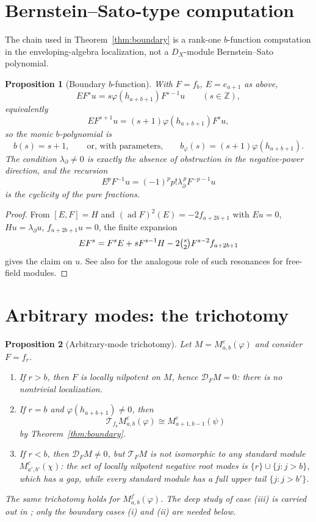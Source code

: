 \documentclass[11pt,a4paper]{article}
\newcommand{\Z}{\mathbb Z}
\newcommand{\ad}{\operatorname{ad}}
\newcommand{\D}{\mathcal D}
\newcommand{\T}{\mathcal T}
\theoremstyle{plainupright}
\newtheorem{proposition}{Proposition}[section]
\begin{document}
\section{Bernstein--Sato-type computation}\label{sec:bsato}

The chain used in Theorem~\ref{thm:boundary} is a rank-one \(b\)-function
computation in the enveloping-algebra localization, not a \(D_X\)-module
Bernstein--Sato polynomial.

\begin{proposition}[Boundary \(b\)-function]\label{prop:bfun}
With \(F=f_b\), \(E=e_{a+1}\) as above,
\[
EF^su=s\varphi(h_{a+b+1})F^{s-1}u\qquad(s\in\Z),
\]
equivalently
\[
EF^{s+1}u=(s+1)\varphi(h_{a+b+1})F^su,
\]
so the monic \(b\)-polynomial is
\[
b(s)=s+1,\qquad\text{or, with parameters,}\qquad
b_\varphi(s)=(s+1)\varphi(h_{a+b+1}).
\]
The condition \(\lambda_\partial\ne0\) is exactly the absence of obstruction
in the negative-power direction, and the recursion
\[
E^pF^{-1}u=(-1)^pp!\lambda_\partial^{\,p}F^{-p-1}u
\]
is the cyclicity of the pure fractions.
\end{proposition}

\begin{proof}
From \([E,F]=H\) and \((\ad F)^2(E)=-2f_{a+2b+1}\) with
\(Eu=0\), \(Hu=\lambda_\partial u\), \(f_{a+2b+1}u=0\), the finite expansion
\[
EF^s=F^sE+sF^{s-1}H-2\tbinom{s}{2}F^{s-2}f_{a+2b+1}
\]
gives the claim on \(u\). See also \cite[Section 5]{FGM} for the analogous
role of such resonances for free-field modules.
\end{proof}

\section{Arbitrary modes: the trichotomy}\label{sec:trichotomy}

\begin{proposition}[Arbitrary-mode trichotomy]\label{prop:trichotomy}
Let \(M=M^c_{a,b}(\varphi)\) and consider \(F=f_r\).
\begin{enumerate}[label=\textup{(\roman*)},leftmargin=2.8em]
\item If \(r>b\), then \(F\) is locally nilpotent on \(M\), hence
\(\D_FM=0\): there is no nontrivial localization.
\item If \(r=b\) and \(\varphi(h_{a+b+1})\ne0\), then
\[
\T_{f_b}M^c_{a,b}(\varphi)\cong M^c_{a+1,b-1}(\psi)
\]
by Theorem~\ref{thm:boundary}.
\item If \(r<b\), then \(\D_FM\ne0\), but \(\T_FM\) is not isomorphic to any
standard module \(M^c_{a',b'}(\chi)\): the set of locally nilpotent negative
root modes is \(\{r\}\cup\{j:j>b\}\), which has a gap, while every standard
module has a full upper tail \(\{j:j>b'\}\).
\end{enumerate}
The same trichotomy holds for \(M^f_{a,b}(\varphi)\). The deep study of case
(iii) is carried out in \cite{Nonboundary}; only the boundary cases (i) and
(ii) are needed below.
\end{proposition}
\end{document}
